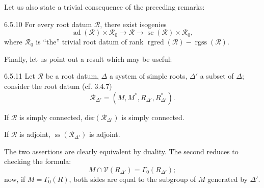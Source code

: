 Let us also state a trivial consequence of the preceding remarks:
\begin{corollary}{6.5.10}\label{XXI.6.5.10}
For every root datum $\mathcal R$, there exist isogenies
\[
\operatorname{ad}(\mathcal R)\times\mathcal R_0\to\mathcal R\to\operatorname{sc}(\mathcal R)\times\mathcal R_0,
\]
where $\mathcal R_0$ is ``the'' trivial root datum of rank $\operatorname{rgred}(\mathcal R)-\operatorname{rgss}(\mathcal R)$.
\end{corollary}
Finally, let us point out a result which may be useful:
\begin{lemma}{6.5.11}\label{XXI.6.5.11}
Let $\mathcal R$ be a root datum, $\Delta$ a system of simple roots, $\Delta'$ a subset of $\Delta$; consider the root datum (cf. 3.4.7)
\[
\mathcal R_{\Delta'}=(M,M^*,R_{\Delta'},R^*_{\Delta'}).
\]
\begin{enumeratei}
\item If $\mathcal R$ is simply connected, $\operatorname{d\acute er}(\mathcal R_{\Delta'})$ is simply connected.
\item If $\mathcal R$ is adjoint, $\operatorname{ss}(\mathcal R_{\Delta'})$ is adjoint.
\end{enumeratei}
\end{lemma}
The two assertions are clearly equivalent by duality. The second reduces to checking the formula:
\[
M\cap\mathcal V(R_{\Delta'})=\Gamma_0(R_{\Delta'});
\]
now, if $M=\Gamma_0(R)$, both sides are equal to the subgroup of $M$ generated by $\Delta'$.


